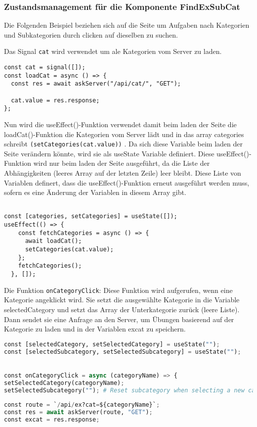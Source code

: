 \documentclass[12pt,a4paper]{article} %
\begin{document}
\subsubsection{Zustandsmanagement für die Komponente FindExSubCat } 
Die Folgenden Beispiel beziehen sich auf die Seite um Aufgaben nach Kategorien und Subkategorien durch clicken auf dieselben zu suchen.

Das Signal \texttt{cat} wird verwendet um ale Kategorien vom Server zu laden.

\begin{lstlisting}
const cat = signal([]);
const loadCat = async () => {
  const res = await askServer("/api/cat/", "GET");

  cat.value = res.response;
};

\end{lstlisting}

Nun wird die useEffect()-Funktion verwendet damit beim laden der Seite die loadCat()-Funktion die Kategorien vom Server lädt und in das array categories schreibt \texttt{(setCategories(cat.value))} . Da sich diese Variable beim laden der Seite verändern könnte, wird sie als useState Variable definiert. 
Diese useEffect()-Funktion wird nur beim laden der Seite ausgeführt, da die Liste der Abhängigkeiten (leeres Array auf der letzten Zeile) leer bleibt. Diese Liste von Variablen definert, dass die useEffect()-Funktion erneut ausgeführt werden muss, sofern es eine Änderung der Variablen in diesem Array gibt.
\begin{lstlisting}

const [categories, setCategories] = useState([]);
useEffect(() => {
    const fetchCategories = async () => {
      await loadCat();
      setCategories(cat.value);
    };
    fetchCategories();
  }, []);

\end{lstlisting}


Die Funktion \texttt{onCategoryClick}: Diese Funktion wird aufgerufen, wenn eine Kategorie angeklickt wird. Sie setzt die ausgewählte Kategorie in die Variable selectedCategory und setzt das Array der Unterkategorie zurück (leere Liste). Dann sendet sie eine Anfrage an den Server, um Übungen basierend auf der Kategorie zu laden und in der Variablen excat zu speichern.

\begin{lstlisting}[language=Python]
const [selectedCategory, setSelectedCategory] = useState("");
const [selectedSubcategory, setSelectedSubcategory] = useState("");


const onCategoryClick = async (categoryName) => {
setSelectedCategory(categoryName);
setSelectedSubcategory(""); # Reset subcategory when selecting a new category
    
const route = `/api/ex?cat=${categoryName}`;
const res = await askServer(route, "GET");
const excat = res.response;
    
\end{lstlisting}
\end{document}
